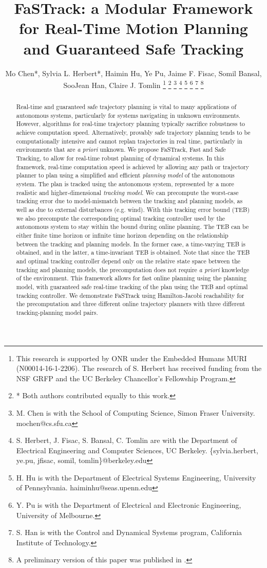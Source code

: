 \documentclass[journal]{IEEEtran}
\title{\LARGE \bf FaSTrack: a Modular Framework for Real-Time Motion Planning and Guaranteed Safe Tracking}
\author{Mo Chen*, Sylvia L. Herbert*, Haimin Hu, Ye Pu, Jaime F. Fisac, Somil Bansal, SooJean Han, Claire J. Tomlin
\thanks{This research is supported by ONR under the Embedded Humans MURI (N00014-16-1-2206). The research of S. Herbert has received funding from the NSF GRFP and the UC Berkeley Chancellor's Fellowship Program.}
\thanks{* Both authors contributed equally to this work.}
\thanks{M. Chen is with the School of Computing Science, Simon Fraser University. mochen@cs.sfu.ca}
\thanks{S. Herbert, J. Fisac, S. Bansal, C. Tomlin are with the Department of Electrical Engineering and Computer Sciences, UC Berkeley. \{sylvia.herbert, ye.pu, jfisac, somil, tomlin\}@berkeley.edu}
\thanks{H. Hu is with the Department of Electrical Systems Engineering, University of Pennsylvania. haiminhu@seas.upenn.edu}
\thanks{Y. Pu is with the Department of Electrical and Electronic Engineering, University of Melbourne.}
\thanks{S. Han is with the Control and Dynamical Systems program, California Institute of Technology.}
\thanks{A preliminary version of this paper was published in \cite{herbert2017fastrack}.}
}
\begin{document}
\maketitle
\thispagestyle{empty}
\pagestyle{empty}

\begin{abstract}
Real-time and guaranteed safe trajectory planning is vital to many applications of autonomous systems, particularly for systems navigating in unknown environments.
However, algorithms for real-time trajectory planning typically sacrifice robustness to achieve computation speed. 
Alternatively, provably safe trajectory planning tends to be computationally intensive and cannot replan trajectories in real time, particularly in environments that are \textit{a priori }unknown. 
We propose FaSTrack, Fast and Safe Tracking, to allow for real-time robust planning of dynamical systems. 
In this framework, real-time computation speed is achieved by allowing any path or trajectory planner to plan using a simplified and efficient \textit{planning model} of the autonomous system.  
The plan is tracked using the autonomous system, represented by a more realistic and higher-dimensional \textit{tracking model}. 
We can precompute the worst-case tracking error due to model-mismatch between the tracking and planning models, as well as due to external disturbances (e.g. wind).  
With this tracking error bound (TEB) we also precompute the corresponding optimal tracking controller used by the autonomous system to stay within the bound during online planning.
The TEB can be either finite time horizon or infinite time horizon depending on the relationship between the tracking and planning models.
In the former case, a time-varying TEB is obtained, and in the latter, a time-invariant TEB is obtained.
Note that since the TEB and optimal tracking controller depend only on the relative state space between the tracking and planning models, the precomputation does not require \textit{a priori} knowledge of the environment.
This framework allows for fast online planning using the planning model, with guaranteed safe real-time tracking of the plan using the TEB and optimal tracking controller.
We demonstrate FaSTrack using Hamilton-Jacobi reachability for the precomputation and three different online trajectory planners with three different tracking-planning model pairs.
\end{abstract}


\end{document}
